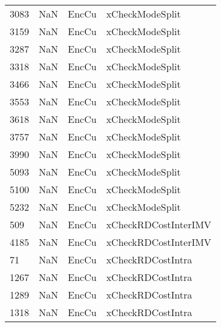 \begin{tabular}{llll}
3083 &                   NaN &                      EncCu &                           xCheckModeSplit \\
3159 &                   NaN &                      EncCu &                           xCheckModeSplit \\
3287 &                   NaN &                      EncCu &                           xCheckModeSplit \\
3318 &                   NaN &                      EncCu &                           xCheckModeSplit \\
3466 &                   NaN &                      EncCu &                           xCheckModeSplit \\
3553 &                   NaN &                      EncCu &                           xCheckModeSplit \\
3618 &                   NaN &                      EncCu &                           xCheckModeSplit \\
3757 &                   NaN &                      EncCu &                           xCheckModeSplit \\
3990 &                   NaN &                      EncCu &                           xCheckModeSplit \\
5093 &                   NaN &                      EncCu &                           xCheckModeSplit \\
5100 &                   NaN &                      EncCu &                           xCheckModeSplit \\
5232 &                   NaN &                      EncCu &                           xCheckModeSplit \\
509  &                   NaN &                      EncCu &                      xCheckRDCostInterIMV \\
4185 &                   NaN &                      EncCu &                      xCheckRDCostInterIMV \\
71   &                   NaN &                      EncCu &                         xCheckRDCostIntra \\
1267 &                   NaN &                      EncCu &                         xCheckRDCostIntra \\
1289 &                   NaN &                      EncCu &                         xCheckRDCostIntra \\
1318 &                   NaN &                      EncCu &                         xCheckRDCostIntra \\

\end{tabular}
